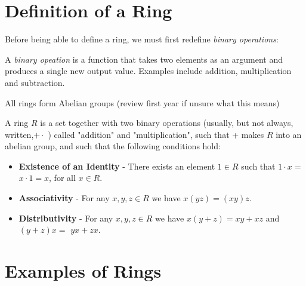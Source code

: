 \section{Definition of a Ring}

\noindent Before being able to define a ring, we must first redefine \emph{binary operations}:


\begin{definition}
  A \emph{binary opeation} is a function that takes two elements as an argument and produces a single new output value. Examples include addition, multiplication and subtraction.
\end{definition}


\begin{remark}
  All rings form Abelian groups (review first year if unsure what this means)
\end{remark}


\begin{definition}[Ring]
 A ring $R$ is a set together with two binary operations (usually, but not always, written,$+ \cdot$ ) called "addition" and "multiplication", such that + makes $R$ into an abelian group, and such that the following conditions hold:

\begin{itemize}

  \item[i)] \textbf{Existence of an Identity} - There exists an element $1 \in R$ such that $1 \cdot x=$ $x \cdot 1=x$, for all $x \in R$.
  \item[ii)] \textbf{Associativity} - For any $x, y, z \in R$ we have $x(y z)=(x y) z$.
  \item[iii)] \textbf{Distributivity} - For any $x, y, z \in R$ we have $x(y+z)=x y+x z$ and $(y+z) x=$ $y x+z x$.

\end{itemize}

\end{definition}

\section{Examples of Rings}

